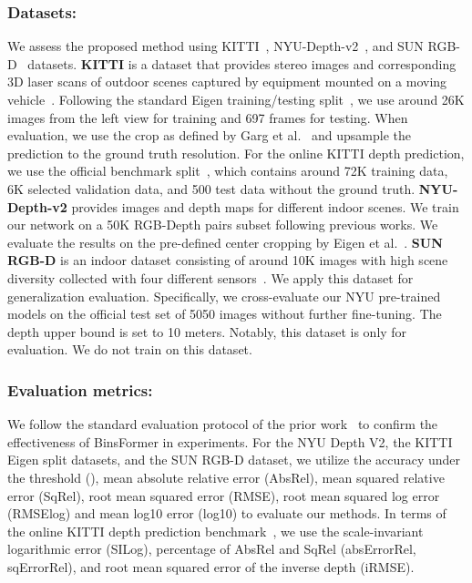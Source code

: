 \documentclass[runningheads]{llncs}
\begin{document}
\subsubsection{Datasets:} We assess the proposed method using KITTI~\cite{geiger2013kitti}, NYU-Depth-v2~\cite{silberman2012nyu}, and SUN RGB-D~\cite{song2015sun} datasets. \textbf{KITTI} is a dataset that provides stereo images and corresponding 3D laser scans of outdoor scenes captured by equipment mounted on a moving vehicle~\cite{geiger2013kitti}. Following the standard Eigen training/testing split~\cite{eigen2014depth}, we use around 26K images from the left view for training and 697 frames for testing. When evaluation, we use the crop as defined by Garg et al.~\cite{garg2016unsupervised} and upsample the prediction to the ground truth resolution. For the online KITTI depth prediction, we use the official benchmark split~\cite{uhrig2017sparsity}, which contains around 72K training data, 6K selected validation data, and 500 test data without the ground truth.  \textbf{NYU-Depth-v2} provides images and depth maps for different indoor scenes. We train our network on a 50K RGB-Depth pairs subset following previous works. We evaluate the results on the pre-defined center cropping by Eigen et al.~\cite{eigen2014depth}. \textbf{SUN RGB-D} is an indoor dataset consisting of around 10K images with high scene diversity collected with four different sensors~\cite{song2015sun}. We apply this dataset for generalization evaluation. Specifically, we cross-evaluate our NYU pre-trained models on the official test set of 5050 images without further fine-tuning. The depth upper bound is set to 10 meters. Notably, this dataset is only for evaluation. We do not train on this dataset.

\subsubsection{Evaluation metrics:} We follow the standard evaluation protocol of the prior work~\cite{eigen2014depth} to confirm the effectiveness of BinsFormer in experiments. For the NYU Depth V2, the KITTI Eigen split datasets, and the SUN RGB-D dataset, we utilize the accuracy under the threshold (), mean absolute relative error (AbsRel), mean squared relative error (SqRel), root mean squared error (RMSE), root mean squared log error (RMSElog) and mean log10 error (log10) to evaluate our methods. In terms of the online KITTI depth prediction benchmark~\cite{uhrig2017sparsity}, we use the scale-invariant logarithmic error (SILog), percentage of AbsRel and SqRel (absErrorRel, sqErrorRel), and root mean squared error of the inverse depth (iRMSE).
\end{document}
